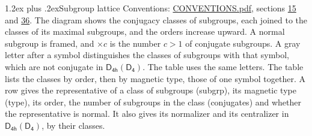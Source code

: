 \documentclass[10pt,a4paper]{article}
\makeatletter
\renewcommand\section{\@startsection{section}{1}{\z@}{-3ex plus -1ex minus -.2ex}%
  {1.2ex plus .2ex}{\normalfont\large\sffamily\bfseries\color{parttitle}}}
\numberwithin{equation}{section}
\newcommand{\grp}[1]{\mathsf{#1}}
\makeatother
\begin{document}
\section{Subgroup lattice}\label{s:subgroups}
Conventions: \href{../../CONVENTIONS.pdf}{CONVENTIONS.pdf}, sections \href{../../../rotation/CONVENTIONS.pdf\#conv.15}{15} and \href{../../CONVENTIONS.pdf\#conv.36}{36}.
The diagram shows the conjugacy classes of subgroups, each joined to the classes of its maximal subgroups, and the orders increase upward. \label{n:index.conjugates.c}\label{n:mark.conjugates}A normal subgroup is framed, and ${\times}c$ is the number $c > 1$ of conjugate subgroups. \label{n:mark.letter}A gray letter after a symbol distinguishes the classes of subgroups with that symbol, which are not conjugate in $\grp{D_{4h}}(\grp{D_{4}})$. The table uses the same letters. The table lists the classes by order, then by magnetic type, those of one symbol together. \label{n:head.subgroup}\label{n:head.magnetic.type}\label{n:head.order}\label{n:head.conjugates}\label{n:head.normal}A row gives the representative of a class of subgroups (subgrp), its magnetic type (type), its order, the number of subgroups in the class (conjugates) and whether the representative is normal. \label{n:head.normalizer}\label{n:head.centralizer}It also gives its normalizer and its centralizer in $\grp{D_{4h}}(\grp{D_{4}})$, by their classes. 
\end{document}
